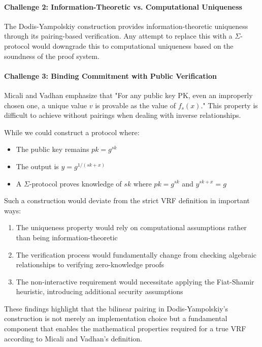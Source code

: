 \paragraph{Challenge 2: Information-Theoretic vs. Computational Uniqueness} The Dodis-Yampolskiy construction provides information-theoretic uniqueness through its pairing-based verification. Any attempt to replace this with a $\Sigma$-protocol would downgrade this to computational uniqueness based on the soundness of the proof system.

\paragraph{Challenge 3: Binding Commitment with Public Verification} Micali and Vadhan emphasize that "For any public key PK, even an improperly chosen one, a unique value $v$ is provable as the value of $f_s(x)$." This property is difficult to achieve without pairings when dealing with inverse relationships.

While we could construct a protocol where:
\begin{itemize}
    \item The public key remains $pk = g^{sk}$
    \item The output is $y = g^{1/(sk+x)}$
    \item A $\Sigma$-protocol proves knowledge of $sk$ where $pk = g^{sk}$ and $y^{sk+x} = g$
\end{itemize}

Such a construction would deviate from the strict VRF definition in important ways:

\begin{enumerate}
    \item The uniqueness property would rely on computational assumptions rather than being information-theoretic
    \item The verification process would fundamentally change from checking algebraic relationships to verifying zero-knowledge proofs
    \item The non-interactive requirement would necessitate applying the Fiat-Shamir heuristic, introducing additional security assumptions
\end{enumerate}

These findings highlight that the bilinear pairing in Dodis-Yampolskiy's construction is not merely an implementation choice but a fundamental component that enables the mathematical properties required for a true VRF according to Micali and Vadhan's definition.

